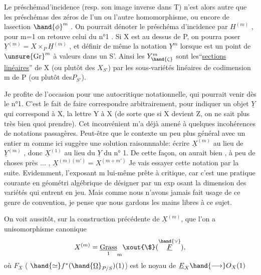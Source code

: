 
Le préschémad'incidence  (resp. son image inverse dans T) n'est alors
autre que les préschémas des zéros de l'un ou l'autre homomorphisme,
ou encore de lasection $\hand{\phi}^{m}$ .  On pourrait dénoter le préschéma
d'incidence par $H^{(m)}$ , pour m=1 on retouve celui du n°1 .  Si X est
au dessus de P, on pourra poser $\underline{Y}^{(m)} = X\times_{P} \underline{H}^{(m)}$ ,  et définir de même
la notation $\underline{Y}^{m}$ lorsque \hand{$\zeta$} est un point de $\unsure{\mathrm{Gr}}^{m}$ à valeurs dans un S'.
Ainsi les  $Y^{m}_{\hand{\zeta}}$  sont les``\uline{sections} \uline{linéaires}''  de X  (ou plutôt des
$X_{S'}$)   par les sous-variétés linéaires de codimension m de P (ou
plutôt des$P_{S'}$).

\margin{$|$}Je profite de l'occasion pour une  autocritique notationnelle,
qui pourrait venir dès le n°1. C'est le fait  de faire correspondre
arbitrairement, pour indiquer un objet $\underline{Y}$ qui correspond à X, la lettre
Y à X  (de sorte que si X devient Z, on ne sait plus très bien quoi
prendre). Cet inconvénient m'a déjà amené à quelques incohérences de
notations passagères.  Peut-être que le contexte un peu plus général
avec un entier m comme ici suggère une solution raisonnnable: écrire
$\underline{X}^{(m)}$ au lieu de  $\underline{Y}^{(m)}$ , donc  $\underline{X}^{(1)}$ au lieu du  $\underline{Y}$  du n° 1. De cette
façon, on  aurait bien , à peu de choses près ... ,  $\underline{X}^{(m)(m')} = X^{(m+m')}$
Je vais essayer cette notation par la suite.  Evidemment, l'exposant m
lui-même prête à critique, car  c'est une pratique courante en géométri
algébrique de désigner par un exp osant la dimension des variétés qui
entrent en jeu. Mais comme nous n'avons jamais fait usage de ce genre
de convention, je pense que nous gardons les mains libres à ce sujet.

On voit aussitôt, sur la construction précédente de $\underline{X}^{(m)}$, que
l'on a unisomorphisme canonique
\[ X^{(m)} = \underset{1}{\underline{\mathrm{Grass}}}_{m}\xout{\$}(\overset{\hand{\vee}}{\underline{F}}) , \]
où  $F_{X}$  ( $\hand{\simeq} f^{*}(\hand{\underline{\Omega}}_{P/S})(1)$)   est le noyau de  $\underline{E}_{X} \hand{\longrightarrow} O_{X}(1)$\hand{,}

